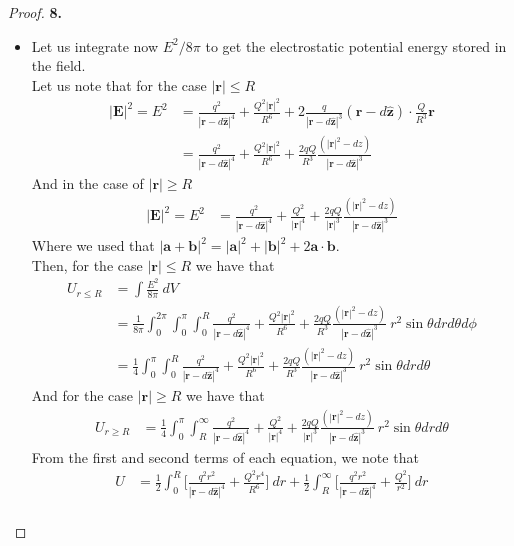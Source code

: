 \documentclass[11pt]{article}
\newcommand{\hatz}{\bm{\hat{z}}}
\theoremstyle{definition}
\begin{document}
\begin{proof}{\textbf{8.}}
\begin{itemize}
\item [(b)] Let us integrate now $E^2/8\pi$ to get the electrostatic potential
energy stored in the field.
\\
Let us note that for the case $|\bm{r}| \leq R$
\begin{align*}
    |\bm{E}|^2 = E^2
    &= \frac{q^2}{|\bm{r} - d\hatz|^4} + \frac{Q^2|\bm{r}|^2}{R^6}
    + 2\frac{q}{|\bm{r} - d\hatz|^3}(\bm{r} - d\hatz)
    \cdot \frac{Q}{R^3}\bm{r}\\
    &= \frac{q^2}{|\bm{r} - d\hatz|^4} + \frac{Q^2|\bm{r}|^2}{R^6}
    + \frac{2qQ}{R^3}
    \frac{(|\bm{r}|^2 - dz)}{|\bm{r} - d\hatz|^3}
\end{align*}
And in the case of $|\bm{r}| \geq R$
\begin{align*}
    |\bm{E}|^2 = E^2
    &= \frac{q^2}{|\bm{r} - d\hatz|^4} + \frac{Q^2}{|\bm{r}|^4}
    + \frac{2qQ}{|\bm{r}|^3}
    \frac{(|\bm{r}|^2 - dz)}{|\bm{r} - d\hatz|^3}
\end{align*}
Where we used that
$|\bm{a} + \bm{b}|^2 = |\bm{a}|^2 + |\bm{b}|^2 + 2\bm{a}\cdot\bm{b}$.
\\
Then, for the case $|\bm{r}| \leq R$ we have that
\begin{align*}
    U_{r \leq R} &= \int \frac{E^2}{8\pi}~dV\\
    &= \frac{1}{8\pi} \int_0^{2\pi} \int_{0}^\pi\int_0^R
    \frac{q^2}{|\bm{r} - d\hatz|^4} + \frac{Q^2|\bm{r}|^2}{R^6}
    + \frac{2qQ}{R^3}\frac{(|\bm{r}|^2 - dz)}{|\bm{r} - d\hatz|^3}
    ~r^2\sin\theta drd\theta d\phi\\
    &= \frac{1}{4} \int_{0}^\pi\int_0^R
    \frac{q^2}{|\bm{r} - d\hatz|^4} + \frac{Q^2|\bm{r}|^2}{R^6}
    + \frac{2qQ}{R^3}\frac{(|\bm{r}|^2 - dz)}{|\bm{r} - d\hatz|^3}
    ~r^2\sin\theta drd\theta
\end{align*}
And for the case $|\bm{r}| \geq R$ we have that
\begin{align*}
    U_{r \geq R} &= \frac{1}{4} \int_{0}^\pi\int_R^\infty
    \frac{q^2}{|\bm{r} - d\hatz|^4} + \frac{Q^2}{|\bm{r}|^4}
    + \frac{2qQ}{|\bm{r}|^3}
    \frac{(|\bm{r}|^2 - dz)}{|\bm{r} - d\hatz|^3}
    ~r^2\sin\theta drd\theta 
\end{align*}
From the first and second terms of each equation, we note that 
\begin{align*}
    U &= \frac{1}{2} \int_0^R
   \bigg[\frac{q^2 r^2}{|\bm{r} - d\hatz|^4} + \frac{Q^2r^4}{R^6}\bigg]
    ~ dr
    + \frac{1}{2} \int_R^\infty
    \bigg[\frac{q^2r^2}{|\bm{r} - d\hatz|^4} + \frac{Q^2}{r^2}\bigg]
    ~ dr\\

\end{align*}
\end{itemize}
\end{proof}
\end{document}

